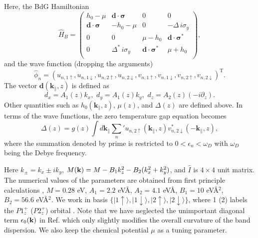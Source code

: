 \documentclass[12pt,twocolumn]{article}
\def\ket#1{\vert #1 \rangle}
\begin{document}
Here, the BdG Hamiltonian
\begin{equation}
\hat{H}_{B}=\left( \begin{array}{cccc}
h_0 -\mu  & \mathbf{d} \cdot \boldsymbol{\sigma}&0&0\\ 
 \mathbf{d} \cdot \boldsymbol{\sigma} &-h_0 -\mu &0&-\Delta\, i\sigma_y\\ 
0 &0& \mu -h_0 & \mathbf{d} \cdot \boldsymbol{\sigma}^* \\
0 &\Delta^{\ast} \, i\sigma_y & \mathbf{d} \cdot \boldsymbol{\sigma}^* & \mu+h_0\\ 
 \end{array} \right), \label{bdgH} 
\end{equation}
and the wave function (dropping the arguments)
\begin{equation}
\hat{\phi}_n=(u_{n,1\uparrow}, u_{n,1\downarrow}, u_{n,2\uparrow}, u_{n,2\downarrow}, 
v_{n,1\uparrow}, v_{n,1\downarrow}, v_{n,2\uparrow}, v_{n,2\downarrow})^\mathrm{T}.
\end{equation}
The vector $\mathbf{d}(\mathbf{k}_\parallel,z)$ is defined as
\begin{equation}
d_x=A_1(z)k_x,\,\, d_y=A_1(z)k_y,\,\, d_z=A_2(z)(-i\partial_z).
\end{equation} 
Other quantities such as $h_0(\mathbf{k}_\parallel,z)$, $\mu(z)$, and $\Delta(z)$ are 
defined above.
In terms of the wave functions, the zero temperature gap equation becomes
\begin{equation}
\Delta(z) = g(z) \int d \mathbf{k}_\parallel \sum_n' u_{n,2 \uparrow}(\mathbf{k}_\parallel,z) v^*_{n,2\downarrow}(-\mathbf{k}_\parallel,z) ,
\end{equation}
where the summation denoted by prime is restricted to $0<\epsilon_n<\omega_D$ with 
$\omega_D$ being the Debye frequency.


Here $k_{\pm}=k_x \pm i k_y $, 
$M({\bf k})=M-B_1 k_z ^2 - B_2 (k_x^2 + k_y^2)$, and $\hat{I}$ is $4\times 4$
unit matrix. The numerical values of 
the parameters are obtained from first principle calculations \cite{zhang,band}, $M=0.28$ eV,
$A_1=2.2$ eV\AA, $A_2=4.1$ eV\AA, $B_1=10$ eV\AA$^2$, $B_2=56.6 $ eV\AA$^2$.
We work in basis $\{\ket{1\uparrow}, \ket{1\downarrow},\ket{2\uparrow},\ket{2\downarrow} \}$,
where 1 (2) labels the $P1_z^+$ ($P2_z^+$) orbital \cite{zhang}. Note that
we have neglected the unimportant diagonal term $\epsilon_0({\bf k})$ in Ref. \cite{zhang} which 
only slightly modifies the overall curvature of the band dispersion. We also
keep the chemical potential $\mu$ as a tuning parameter.
\end{document}
